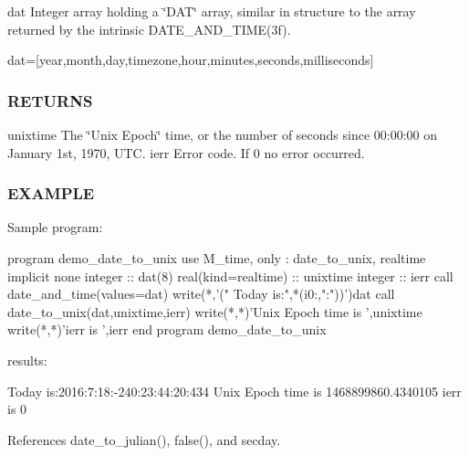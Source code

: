 dat Integer array holding a \char`\"{}\+D\+A\+T\char`\"{} array, similar in structure to the array returned by the intrinsic D\+A\+T\+E\+\_\+\+A\+N\+D\+\_\+\+T\+I\+M\+E(3f).

dat=\mbox{[}year,month,day,timezone,hour,minutes,seconds,milliseconds\mbox{]} \subsubsection*{R\+E\+T\+U\+R\+NS}

unixtime The \char`\"{}\+Unix Epoch\char`\"{} time, or the number of seconds since 00\+:00\+:00 on January 1st, 1970, U\+TC. ierr Error code. If 0 no error occurred.

\subsubsection*{E\+X\+A\+M\+P\+LE}

\begin{DoxyVerb}Sample program:

 program demo_date_to_unix
 use M_time, only : date_to_unix, realtime
 implicit none
 integer             :: dat(8)
 real(kind=realtime) :: unixtime
 integer             :: ierr
    call date_and_time(values=dat)
    write(*,'(" Today is:",*(i0:,":"))')dat
    call date_to_unix(dat,unixtime,ierr)
    write(*,*)'Unix Epoch time is ',unixtime
    write(*,*)'ierr is ',ierr
 end program demo_date_to_unix

results:

 Today is:2016:7:18:-240:23:44:20:434
 Unix Epoch time is    1468899860.4340105
 ierr is            0 \end{DoxyVerb}
 

References date\+\_\+to\+\_\+julian(), false(), and secday.

